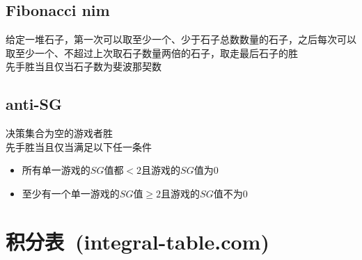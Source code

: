     \subsection*{Fibonacci nim}
        给定一堆石子，第一次可以取至少一个、少于石子总数数量的石子，之后每次可以取至少一个、不超过上次取石子数量两倍的石子，取走最后石子的胜
        \\先手胜当且仅当石子数为斐波那契数
    \subsection*{anti-SG}
        决策集合为空的游戏者胜
        \\先手胜当且仅当满足以下任一条件
        \begin{itemize}[nosep,wide=0pt]
            \item 所有单一游戏的$ SG $值都$ < 2 $且游戏的$ SG $值为$ 0 $
            \item 至少有一个单一游戏的$ SG $值$ \geq 2 $且游戏的$ SG $值不为$ 0 $
        \end{itemize}
\section{积分表\ \small(integral-table.com)}
    \begin{multicols}{2}
        
    \end{multicols}
